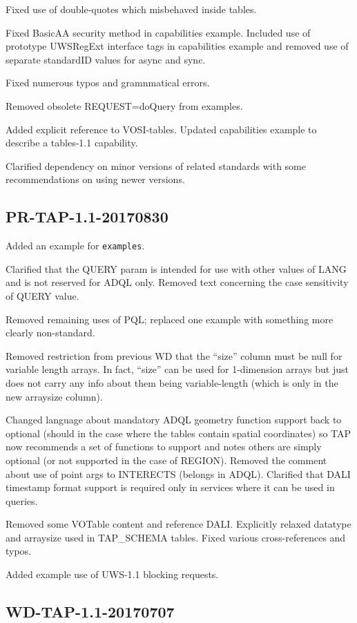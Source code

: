 \documentclass[11pt,letter]{ivoa}
\newcommand{\tapschema}{TAP\_SCHE\-MA}
\newcommand{\tapschema}{\mbox{%
  \relsize{-0.5}TAP\discretionary{-}{}{\kern-2pt\_}SCHEMA}}
\begin{document}
Fixed use of double-quotes which misbehaved inside tables. 

Fixed BasicAA security method in capabilities example. Included use of prototype
UWSRegExt interface tags in capabilities example and removed use of separate
standardID values for async and sync.

Fixed numerous typos and gramnmatical errors.

Removed obsolete REQUEST=doQuery from examples.

Added explicit reference to VOSI-tables. Updated capabilities example to describe a
tables-1.1 capability.

Clarified dependency on minor versions of related standards with some recommendations on
using newer versions.

\subsection{PR-TAP-1.1-20170830}

Added an example for \verb|examples|.

Clarified that the QUERY param is intended for use with other values of LANG and is not
reserved for ADQL only. Removed text concerning the case sensitivity of QUERY value.

Removed remaining uses of PQL; replaced one example with something more clearly non-standard.

Removed restriction from previous WD that the ``size'' column must be null for variable length arrays. In fact, ``size'' can be used for 1-dimension arrays but just does not carry any info about them being variable-length (which is only in the new arraysize column).

Changed language about mandatory ADQL geometry function support back to optional (should in
the case where the tables contain spatial coordinates) so TAP now recommends a set of functions to support and notes others are simply optional (or not supported in the case of REGION). Removed the comment about use of point args to INTERECTS (belongs in ADQL). Clarified that DALI timestamp format support is required only in services where it can be used in queries.

Removed some VOTable content and reference DALI. Explicitly relaxed datatype and arraysize used in \tapschema{} tables. Fixed various cross-references and typos. 

Added example use of UWS-1.1 blocking requests.

\subsection{WD-TAP-1.1-20170707}
\end{document}
